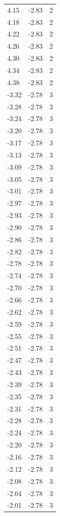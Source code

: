 \begin{longtable}{lrr}
  4.15 & -2.83 & 2 \\
  4.18 & -2.83 & 2 \\
  4.22 & -2.83 & 2 \\
  4.26 & -2.83 & 2 \\
  4.30 & -2.83 & 2 \\
  4.34 & -2.83 & 2 \\
  4.38 & -2.83 & 2 \\
  -3.32 & -2.78 & 3 \\
  -3.28 & -2.78 & 3 \\
  -3.24 & -2.78 & 3 \\
  -3.20 & -2.78 & 3 \\
  -3.17 & -2.78 & 3 \\
  -3.13 & -2.78 & 3 \\
  -3.09 & -2.78 & 3 \\
  -3.05 & -2.78 & 3 \\
  -3.01 & -2.78 & 3 \\
  -2.97 & -2.78 & 3 \\
  -2.93 & -2.78 & 3 \\
  -2.90 & -2.78 & 3 \\
  -2.86 & -2.78 & 3 \\
  -2.82 & -2.78 & 3 \\
  -2.78 & -2.78 & 3 \\
  -2.74 & -2.78 & 3 \\
  -2.70 & -2.78 & 3 \\
  -2.66 & -2.78 & 3 \\
  -2.62 & -2.78 & 3 \\
  -2.59 & -2.78 & 3 \\
  -2.55 & -2.78 & 3 \\
  -2.51 & -2.78 & 3 \\
  -2.47 & -2.78 & 3 \\
  -2.43 & -2.78 & 3 \\
  -2.39 & -2.78 & 3 \\
  -2.35 & -2.78 & 3 \\
  -2.31 & -2.78 & 3 \\
  -2.28 & -2.78 & 3 \\
  -2.24 & -2.78 & 3 \\
  -2.20 & -2.78 & 3 \\
  -2.16 & -2.78 & 3 \\
  -2.12 & -2.78 & 3 \\
  -2.08 & -2.78 & 3 \\
  -2.04 & -2.78 & 3 \\
  -2.01 & -2.78 & 3 \\

\end{longtable}
